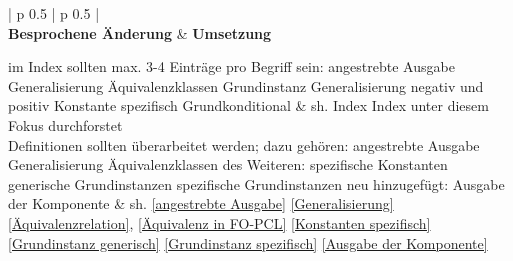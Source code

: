 \documentclass[a4paper, 11pt]{book}
\newlength{\currentLongTableWidth} %
\begin{document}
\setlength{\currentLongTableWidth}{\textwidth} %
\addtolength{\currentLongTableWidth}{-4\tabcolsep} %
\begin{footnotesize}
	\begin{longtable}{ | p {0.5\currentLongTableWidth} | p {0.5\currentLongTableWidth}  |}
		\hline
		\\\hline\hline
		\hline
		\textbf{Besprochene Änderung} 
		& \textbf{Umsetzung} 
		
		
		\endhead
		\hline
		\endfoot
		\endlastfoot
		\hline
		im Index sollten max. 3-4 Einträge pro Begriff sein: \newline angestrebte Ausgabe \newline Generalisierung \newline Äquivalenzklassen \newline Grundinstanz \newline Generalisierung  negativ und positiv \newline Konstante spezifisch \newline Grundkonditional
		& sh.  Index \newline \newline \newline \newline Index unter diesem Fokus durchforstet\\
		\hline
		Definitionen sollten überarbeitet werden; dazu gehören: \newline angestrebte Ausgabe \newline Generalisierung \newline Äquivalenzklassen \newline des Weiteren: \newline spezifische Konstanten \newline generische Grundinstanzen \newline spezifische Grundinstanzen \newline neu hinzugefügt: Ausgabe der Komponente
		&  sh. \newline \newline \ref{angestrebte Ausgabe} \newline \ref{Generalisierung} \newline \ref{Äquivalenzrelation}, \ref{Äquivalenz in FO-PCL} \newline \newline \ref{Konstanten spezifisch} \newline \ref{Grundinstanz generisch} \newline \ref{Grundinstanz spezifisch} \newline \ref{Ausgabe der Komponente} \\

\end{longtable}
\end{footnotesize}
\end{document}

